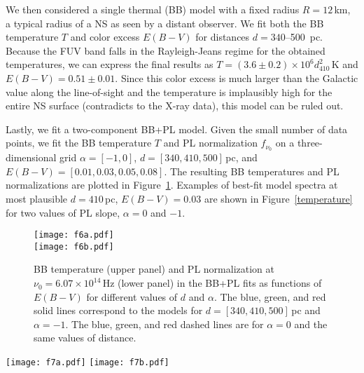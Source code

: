 \documentclass[iop]{emulateapj}
\begin{document}
We then considered a single thermal (BB) model with a fixed radius $R=12$\,km, a typical radius of a NS as seen by a distant observer. We fit both the BB temperature $T$ and color excess $E(B-V)$ for distances $d=340$--500\, pc. Because the FUV band falls in the Rayleigh-Jeans regime for the obtained temperatures, we can express the final results as  $T=(3.6\pm0.2)\times10^6 d_{410}^2$\,K and $E(B-V)=0.51\pm0.01$. Since this color excess is much larger than the Galactic value along the line-of-sight and the temperature is implausibly high for the entire NS surface (contradicts to the X-ray data), this model can be ruled out.

Lastly, we fit a two-component BB+PL model. Given the small number of data points, we fit the BB temperature $T$ and PL normalization $f_{\nu_0}$ on a three-dimensional grid $\alpha=[-1, 0]$, $d=[340, 410, 500]$\,pc, and $E(B-V)=[0.01, 0.03, 0.05, 0.08]$. The resulting BB temperatures and PL normalizations are plotted in Figure~\ref{t_ebv}.  Examples of best-fit model spectra at most plausible $d=410$\,pc, $E(B-V)=0.03$ are shown in Figure~\ref{temperature} for two values of PL slope, $\alpha=0$ and $-1$.


\begin{figure}
\texttt{[image: f6a.pdf]}\\
\texttt{[image: f6b.pdf]}
\caption{BB temperature (upper panel) and PL normalization at $\nu_0=6.07\times 10^{14}$\,Hz (lower panel) in the BB+PL fits  as functions of $E(B-V)$ for different values of  $d$ and $\alpha$. The blue, green, and red solid lines correspond to the models for $d=[340, 410, 500]$\,pc and $\alpha=-1$. The blue, green, and red dashed lines are for $\alpha=0$ and the same values of distance.}
\label{t_ebv}
\end{figure}


\begin{figure*}
\texttt{[image: f7a.pdf]}
\texttt{[image: f7b.pdf]}
\caption{
Examples of the BB+PL fit to the {\sl HST} photometry results for the J2124 pulsar, for two values of the PL slope, $\alpha=0$ and $-1$, at $d=410$ pc and $E(B-V)=0.03$. The red dashed lines and blue dash-dot lines show the BB and PL components, respectively, while the black solid lines show their sums. The downward arrows are the VLT limits reported by \citet{2004AdSpR..33..616M}. The black horizontal lines show the filter widths at half maximum.}
\label{temperature}
\end{figure*}
\end{document}
